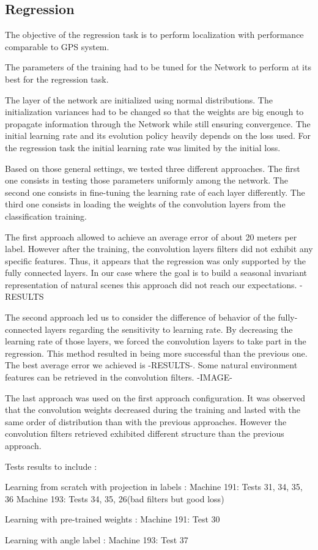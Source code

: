 \subsection{Regression}
The objective of the regression task is to perform localization with performance comparable to GPS system.

The parameters of the training had to be tuned for the Network to perform at its best for the regression task.

The layer of the network are initialized using normal distributions. The initialization variances had to be changed so that the weights are big enough to propagate information through the Network while still ensuring convergence.
The initial learning rate and its evolution policy heavily depends on the loss used. For the regression task the initial learning rate was limited by the initial loss.

Based on those general settings, we tested three different approaches. The first one consists in testing those parameters uniformly among the network. The second one consists in fine-tuning the learning rate of each layer differently. The third one consists in loading the weights of the convolution layers from the classification training.

The first approach allowed to achieve an average error of about 20 meters per label. However after the training, the convolution layers filters did not exhibit any specific features. Thus, it appears that the regression was only supported by the fully connected layers. In our case where the goal is to build a seasonal invariant representation of natural scenes this approach did not reach our expectations.
-RESULTS

The second approach led us to consider the difference of behavior of the fully-connected layers regarding the sensitivity to learning rate. By decreasing the learning rate of those layers, we forced the convolution layers to take part in the regression. This method resulted in being more successful than the previous one. The best average error we achieved is -RESULTS-. Some natural environment features can be retrieved in the convolution filters.
-IMAGE-

The last approach was used on the first approach configuration. It was observed that the convolution weights decreased during the training and lasted with the same order of distribution than with the previous approaches. However the convolution filters retrieved exhibited different structure than the previous approach.

Tests results to include :

Learning from scratch with projection in labels :
Machine 191: Tests 31, 34, 35, 36
Machine 193: Tests 34, 35, 26(bad filters but good loss)

Learning with pre-trained weights :
Machine 191: Test 30

Learning with angle label :
Machine 193: Test 37
